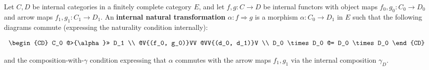 Let $C, D$ be internal categories in a finitely complete category $E$, and let $f, g : C \to D$ be internal functors with object maps $f_0, g_0 : C_0 \to D_0$ and arrow maps $f_1, g_1 : C_1 \to D_1$. An \textbf{internal natural transformation} $\alpha : f \Rightarrow g$ is a morphism $\alpha : C_0 \to D_1$ in $E$ such that the following diagrams commute (expressing the naturality condition internally):

\[
\begin{CD}
C_0 @>{\alpha}>> D_1 \\
@V{(f_0, g_0)}VV @VV{(d_0, d_1)}V \\
D_0 \times D_0 @= D_0 \times D_0
\end{CD}
\]

and the composition-with-$\gamma$ condition expressing that $\alpha$ commutes with the arrow maps $f_1, g_1$ via the internal composition $\gamma_D$.
